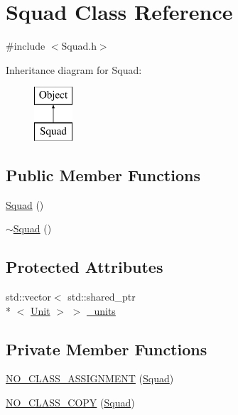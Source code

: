 \section{Squad Class Reference}
\label{class_squad}


{\ttfamily \#include $<$Squad.\-h$>$}

Inheritance diagram for Squad\-:\begin{figure}[H]
\begin{center}
\leavevmode
\includegraphics[height=2.000000cm]{class_squad}
\end{center}
\end{figure}
\subsection*{Public Member Functions}
\begin{DoxyCompactItemize}
\item 
\hyperlink{class_squad_a0e37f7593f55bff89220ec031d19f5f0}{Squad} ()
\item 
\hyperlink{class_squad_a691e06cc0bdd9ca4605f9f2e7b3c1987}{$\sim$\-Squad} ()
\end{DoxyCompactItemize}
\subsection*{Protected Attributes}
\begin{DoxyCompactItemize}
\item 
std\-::vector$<$ std\-::shared\-\_\-ptr\\*
$<$ \hyperlink{class_unit}{Unit} $>$ $>$ \hyperlink{class_squad_ad6a1e4dd1d91190c535c63da279bed3d}{\-\_\-units}
\end{DoxyCompactItemize}
\subsection*{Private Member Functions}
\begin{DoxyCompactItemize}
\item 
\hyperlink{class_squad_a0a7307cabb4e3ccefbd87074de69ffa3}{N\-O\-\_\-\-C\-L\-A\-S\-S\-\_\-\-A\-S\-S\-I\-G\-N\-M\-E\-N\-T} (\hyperlink{class_squad}{Squad})
\item 
\hyperlink{class_squad_ac9c5234acd0c02410bc0aa88e66df70b}{N\-O\-\_\-\-C\-L\-A\-S\-S\-\_\-\-C\-O\-P\-Y} (\hyperlink{class_squad}{Squad})
\end{DoxyCompactItemize}
